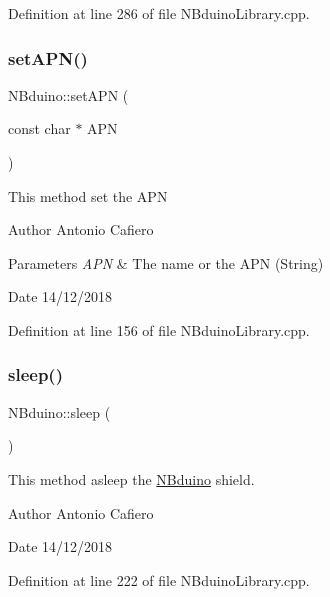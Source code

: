 Definition at line 286 of file N\+Bduino\+Library.\+cpp.

\mbox{\label{class_n_bduino_a25ed04c59841533708771bdd835a2572}} 
\subsubsection{\texorpdfstring{set\+A\+P\+N()}{setAPN()}}
{\footnotesize\ttfamily N\+Bduino\+::set\+A\+PN (\begin{DoxyParamCaption}\item[{const char $\ast$}]{A\+PN }\end{DoxyParamCaption})}

This method set the A\+PN \begin{DoxyAuthor}{Author}
Antonio Cafiero 
\end{DoxyAuthor}

\begin{DoxyParams}{Parameters}
{\em A\+PN} & The name or the A\+PN (String) \\
\hline
\end{DoxyParams}
\begin{DoxyDate}{Date}
14/12/2018 
\end{DoxyDate}


Definition at line 156 of file N\+Bduino\+Library.\+cpp.

\mbox{\label{class_n_bduino_ac7bf8f7f0552ad2cbda4b3e91a82bfca}} 
\subsubsection{\texorpdfstring{sleep()}{sleep()}}
{\footnotesize\ttfamily N\+Bduino\+::sleep (\begin{DoxyParamCaption}{ }\end{DoxyParamCaption})}

This method asleep the \mbox{\hyperlink{class_n_bduino}{N\+Bduino}} shield. \begin{DoxyAuthor}{Author}
Antonio Cafiero 
\end{DoxyAuthor}
\begin{DoxyDate}{Date}
14/12/2018 
\end{DoxyDate}


Definition at line 222 of file N\+Bduino\+Library.\+cpp.


